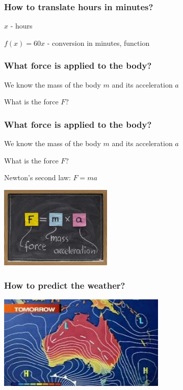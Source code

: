 \documentclass[default]{beamer}
\begin{document}
	\begin{frame}
		\frametitle{How to translate hours in minutes?}
		
		\Large
		$x$ - hours
		
		$f(x)=60x$ - conversion in minutes, function
	\end{frame}

	\begin{frame}
		\frametitle{What force is applied to the body?}
		
		\Large
		We know the mass of the body $m$ and its acceleration $a$
		
		What is the force $F$?
	\end{frame}

	\begin{frame}
		\frametitle{What force is applied to the body?}
		
		\Large
		We know the mass of the body $m$ and its acceleration $a$
		
		What is the force $F$?
		
		Newton's second law: $F=ma$
		
		\vspace*{10pt}
		\centering
		\includegraphics[width=0.4\textwidth]{intro2.jpg}
	\end{frame}

	\begin{frame}
		\frametitle{How to predict the weather?}
		
		
		\centering
		\includegraphics[width=0.6\textwidth]{intro3.jpg}
	\end{frame}
\end{document}
